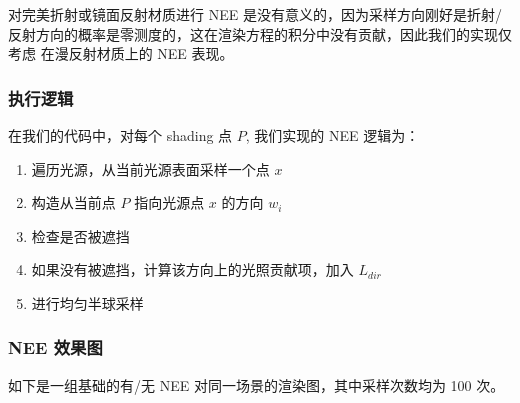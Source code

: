 \documentclass[UTF8]{ctexart}
\begin{document}
    对完美折射或镜面反射材质进行 NEE 是没有意义的，因为采样方向刚好是折射/反射方向的概率是零测度的，这在渲染方程的积分中没有贡献，因此我们的实现仅考虑
    在漫反射材质上的 NEE 表现。

    \subsubsection{执行逻辑}

    在我们的代码中，对每个 shading 点 $P$, 我们实现的 NEE 逻辑为：

    \begin{enumerate}
        \item 遍历光源，从当前光源表面采样一个点 $x$
        \item 构造从当前点 $P$ 指向光源点 $x$ 的方向 $w_i$
        \item 检查是否被遮挡
        \item 如果没有被遮挡，计算该方向上的光照贡献项，加入 $L_{dir}$
        \item 进行均匀半球采样
    \end{enumerate}

    \subsubsection{NEE 效果图}

    如下是一组基础的有/无 NEE 对同一场景的渲染图，其中采样次数均为 100 次。
\end{document}
